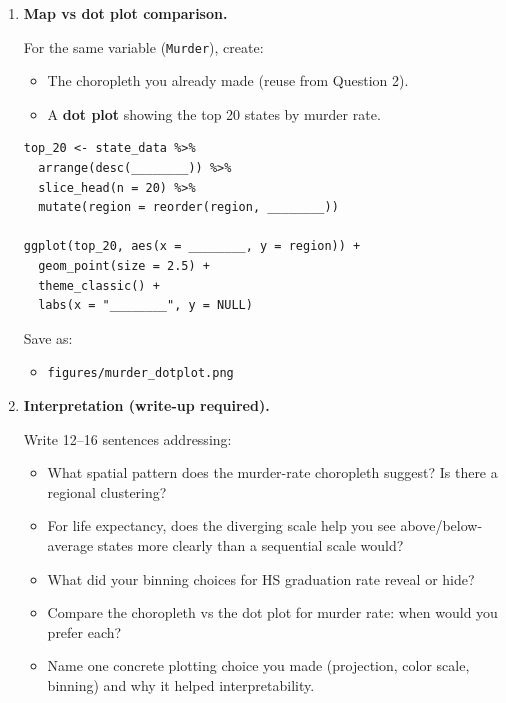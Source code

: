 \documentclass[11pt]{article}
\begin{document}
\begin{enumerate}
\begin{verbatim}
state_data <- state_data %>%
  mutate(grad_cat = cut(HS.Grad,
    breaks = c(0, ________, ________, ________, 100),
    labels = c("________", "________", "________", "________")))
\end{verbatim}

Save as:
\begin{itemize}
  \item \texttt{figures/hs\_grad\_binned.png}
\end{itemize}

\item \textbf{Map vs dot plot comparison.}

For the same variable (\texttt{Murder}), create:
\begin{itemize}
  \item The choropleth you already made (reuse from Question 2).
  \item A \textbf{dot plot} showing the top 20 states by murder rate.
\end{itemize}

\begin{verbatim}
top_20 <- state_data %>%
  arrange(desc(________)) %>%
  slice_head(n = 20) %>%
  mutate(region = reorder(region, ________))

ggplot(top_20, aes(x = ________, y = region)) +
  geom_point(size = 2.5) +
  theme_classic() +
  labs(x = "________", y = NULL)
\end{verbatim}

Save as:
\begin{itemize}
  \item \texttt{figures/murder\_dotplot.png}
\end{itemize}

\item \textbf{Interpretation (write-up required).}

Write 12--16 sentences addressing:
\begin{itemize}
  \item What spatial pattern does the murder-rate choropleth suggest? Is there a regional clustering?
  \item For life expectancy, does the diverging scale help you see above/below-average states more clearly than a sequential scale would?
  \item What did your binning choices for HS graduation rate reveal or hide?
  \item Compare the choropleth vs the dot plot for murder rate: when would you prefer each?
  \item Name one concrete plotting choice you made (projection, color scale, binning) and why it helped interpretability.
\end{itemize}


\end{enumerate}
\end{document}
